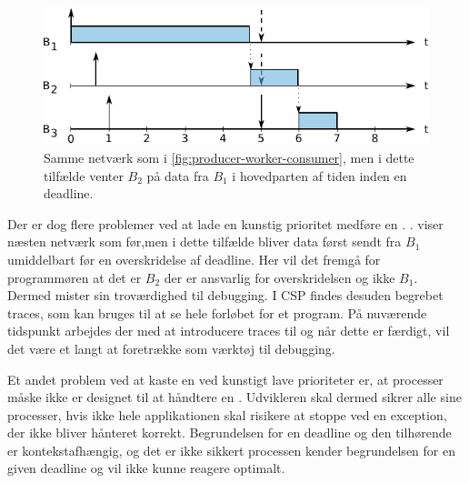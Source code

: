 \begin{figure}
 \begin{center}
  \includegraphics[scale=1.00]{images/producer-worker-consumer2}
  \caption{Samme netværk som i \autoref{fig:producer-worker-consumer}, men i dette tilfælde venter $B_2$  på data fra $B_1$ i hovedparten af tiden inden en deadline.}
  \label{fig:producer-worker-consumer2}
  \end{center}
\end{figure}


Der er dog flere problemer ved at lade en kunstig prioritet medføre en .  .  viser næsten netværk som før,men i dette tilfælde bliver data først sendt fra $B_1$ umiddelbart før en overskridelse af deadline. Her vil det fremgå for programmøren  at det er $B_2$ der er ansvarlig for overskridelsen og ikke $B_1$. Dermed mister  sin troværdighed til debugging. I CSP findes desuden begrebet traces, som kan bruges til at se hele forløbet for et program. På nuværende tidspunkt arbejdes der med at introducere traces til \pycsp og når dette er færdigt, vil det være et langt at foretrække som værktøj til debugging.

Et andet problem ved at kaste en  ved kunstigt lave prioriteter er, at processer måske  ikke er designet til at håndtere en . Udvikleren skal dermed sikrer alle sine processer, hvis ikke hele applikationen skal risikere at stoppe ved en exception, der ikke bliver hånteret korrekt. Begrundelsen for en deadline og den tilhørende  er kontekstafhængig, og  det er ikke sikkert processen kender begrundelsen for en given deadline og vil  ikke kunne reagere optimalt. 

